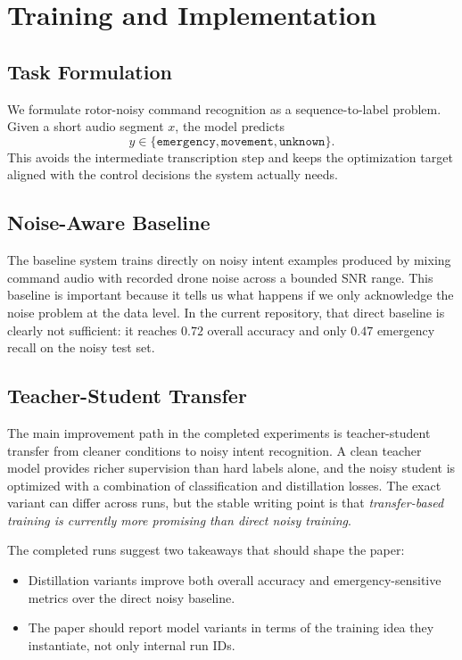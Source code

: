 \section{Training and Implementation}
\label{sec:training}

\subsection{Task Formulation}

We formulate rotor-noisy command recognition as a sequence-to-label problem. Given a short audio segment $x$, the model predicts
\[
y \in \{\texttt{emergency}, \texttt{movement}, \texttt{unknown}\}.
\]
This avoids the intermediate transcription step and keeps the optimization target aligned with the control decisions the system actually needs.

\subsection{Noise-Aware Baseline}

The baseline system trains directly on noisy intent examples produced by mixing command audio with recorded drone noise across a bounded SNR range. This baseline is important because it tells us what happens if we only acknowledge the noise problem at the data level. In the current repository, that direct baseline is clearly not sufficient: it reaches $0.72$ overall accuracy and only $0.47$ emergency recall on the noisy test set.

\subsection{Teacher-Student Transfer}

The main improvement path in the completed experiments is teacher-student transfer from cleaner conditions to noisy intent recognition. A clean teacher model provides richer supervision than hard labels alone, and the noisy student is optimized with a combination of classification and distillation losses. The exact variant can differ across runs, but the stable writing point is that \emph{transfer-based training is currently more promising than direct noisy training}.

The completed runs suggest two takeaways that should shape the paper:
\begin{itemize}
\item Distillation variants improve both overall accuracy and emergency-sensitive metrics over the direct noisy baseline.
\item The paper should report model variants in terms of the training idea they instantiate, not only internal run IDs.
\end{itemize}

